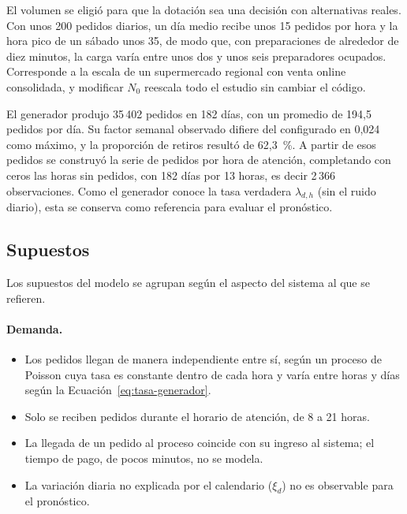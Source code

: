 El volumen se eligió para que la dotación sea una decisión con alternativas reales.
Con unos 200 pedidos diarios, un día medio recibe unos 15 pedidos por hora y la hora pico de un sábado unos 35, de modo que, con preparaciones de alrededor de diez minutos, la carga varía entre unos dos y unos seis preparadores ocupados.
Corresponde a la escala de un supermercado regional con venta online consolidada, y modificar $N_0$ reescala todo el estudio sin cambiar el código.

El generador produjo 35\,402 pedidos en 182 días, con un promedio de 194,5 pedidos por día.
Su factor semanal observado difiere del configurado en 0,024 como máximo, y la proporción de retiros resultó de 62,3~\%.
A partir de esos pedidos se construyó la serie de pedidos por hora de atención, completando con ceros las horas sin pedidos, con 182 días por 13 horas, es decir 2\,366 observaciones.
Como el generador conoce la tasa verdadera $\lambda_{d,h}$ (sin el ruido diario), esta se conserva como referencia para evaluar el pronóstico.

\subsection{Supuestos}
\label{sec:supuestos}

Los supuestos del modelo se agrupan según el aspecto del sistema al que se refieren.

\paragraph{Demanda.}
\begin{itemize}
  \item Los pedidos llegan de manera independiente entre sí, según un proceso de Poisson cuya tasa es constante dentro de cada hora y varía entre horas y días según la Ecuación~\eqref{eq:tasa-generador}.
  \item Solo se reciben pedidos durante el horario de atención, de 8 a 21 horas.
  \item La llegada de un pedido al proceso coincide con su ingreso al sistema; el tiempo de pago, de pocos minutos, no se modela.
  \item La variación diaria no explicada por el calendario ($\xi_d$) no es observable para el pronóstico.
\end{itemize}

